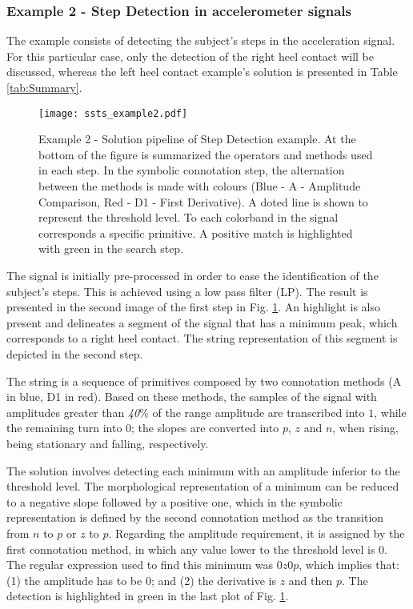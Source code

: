 \subsubsection{Example 2 - Step Detection in accelerometer signals}

The example consists of detecting the subject's steps in the acceleration signal. For this particular case, only the detection of the right heel contact will be discussed, whereas the left heel contact example's solution is presented in Table \ref{tab:Summary}.

\begin{figure}[H]
  \centering
      \texttt{[image: ssts\_example2.pdf]}
  \caption{Example 2 - Solution pipeline of Step Detection example. At the bottom of the figure is summarized the operators and methods used in each step. In the symbolic connotation step, the alternation between the methods is made with colours (Blue - A - Amplitude Comparison, Red - D1 - First Derivative). A doted line is shown to represent the threshold level. To each colorband in the signal corresponds a specific primitive. A positive match is highlighted with green in the search step.}
  \label{fig:Exercise2}
\end{figure}

The signal is initially pre-processed in order to ease the identification of the subject's steps. This is achieved using a low pass filter (LP). The result is presented in the second image of the first step in Fig. \ref{fig:Exercise2}. An highlight is also present and delineates a segment of the signal that has a minimum peak, which corresponds to a right heel contact. The string representation of this segment is depicted in the second step.
\par
The string is a sequence of primitives composed by two connotation methods (A in blue, D1 in red). Based on these methods, the samples of the signal with amplitudes greater than \textit{40}\% of the range amplitude are transcribed into $1$, while the remaining turn into $0$; the slopes are converted into $p$, $z$ and $n$, when rising, being stationary and falling, respectively.
\par
The solution involves detecting each minimum with an amplitude inferior to the threshold level. The morphological representation of a minimum can be reduced to a negative slope followed by a positive one, which in the symbolic representation is defined by the second connotation method as the transition from $n$ to $p$ or $z$ to $p$. Regarding the amplitude requirement, it is assigned by the first connotation method, in which any value lower to the threshold level is $0$. The regular expression used to find this minimum was $0z0p$, which implies that: (1) the amplitude has to be $0$; and (2) the derivative is $z$ and then $p$. The detection is highlighted in green in the last plot of Fig. \ref{fig:Exercise2}.

